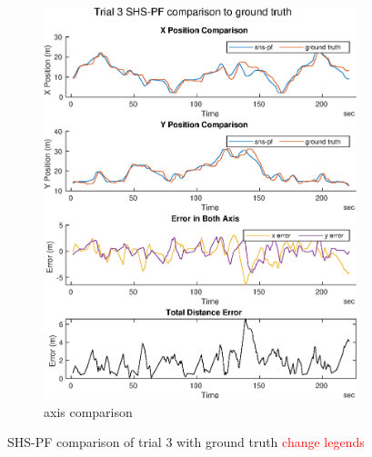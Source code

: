 \begin{figure}[H]
\begin{subfigure}[t]{.45\textwidth}
		\includegraphics[width=\linewidth]{images/20201029_1804_shs-pf_trial_3_1}
		\caption{axis comparison}
		\label{fig:shspf_trial3_comparison}
	\end{subfigure}
	\caption{SHS-PF comparison of trial 3 with ground truth \textcolor{red}{change legends}}
	\label{fig:shspf_trial3_shs_gt_comparison}
\end{figure}
